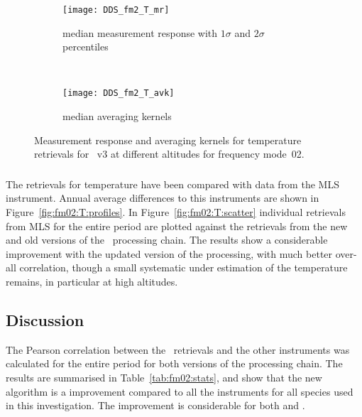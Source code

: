 \begin{figure}[htpb]
    \centering
    \begin{subfigure}[b]{0.49\textwidth}
        \texttt{[image: DDS\_fm2\_T\_mr]}
        \caption{median measurement response with $1\sigma$ and $2\sigma$
        percentiles}
        \label{fig:fm02:T:mr}
    \end{subfigure}
    \,
    \begin{subfigure}[b]{0.49\textwidth}
        \texttt{[image: DDS\_fm2\_T\_avk]}
        \caption{median averaging kernels}
        \label{fig:fm02:T:avk}
    \end{subfigure}
    \caption{Measurement response and averaging kernels for temperature
    retrievals for \smr~v3 at different altitudes for frequency mode~02.}
    \label{fig:fm02:T:mr_avk}
\end{figure}

\subsubsection{}
\label{sec:fm02:comparison:temperature}
The retrievals for temperature have been compared with data from the MLS
instrument. Annual average differences to this instruments are shown in
Figure~\ref{fig:fm02:T:profiles}. In Figure~\ref{fig:fm02:T:scatter} individual
retrievals from MLS for the entire period are plotted against the
retrievals from the new and old versions of the \smr\ processing chain. The
results show a considerable improvement with the updated version of the
processing, with much better over-all correlation, though a small systematic
under estimation of the temperature remains, in particular at high altitudes.


\subsection{Discussion}
\label{sec:fm02:discussion}
The Pearson correlation between the \smr\ retrievals and the other instruments
was calculated for the entire period for both versions of the processing chain.
The results are summarised in Table~\ref{tab:fm02:stats}, and show that the
new algorithm is a improvement compared to all the instruments for all species
used in this investigation. The improvement is considerable for both 
and .


